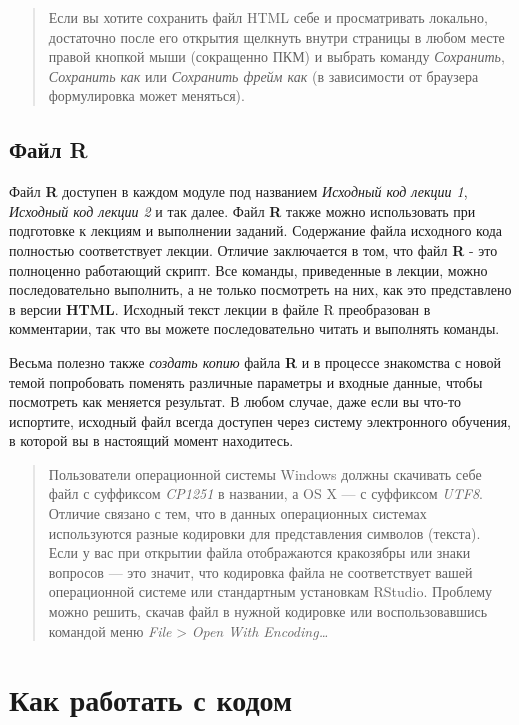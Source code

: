 \documentclass[]{book}
\begin{document}
\begin{quote}
Если вы хотите сохранить файл HTML себе и просматривать локально,
достаточно после его открытия щелкнуть внутри страницы в любом месте
правой кнопкой мыши (сокращенно ПКМ) и выбрать команду \emph{Сохранить},
\emph{Сохранить как} или \emph{Сохранить фрейм как} (в зависимости от
браузера формулировка может меняться).
\end{quote}

\subsection*{Файл R}\label{-r}

Файл \textbf{R} доступен в каждом модуле под названием \emph{Исходный
код лекции 1}, \emph{Исходный код лекции 2} и так далее. Файл \textbf{R}
также можно использовать при подготовке к лекциям и выполнении заданий.
Содержание файла исходного кода полностью соответствует лекции. Отличие
заключается в том, что файл \textbf{R} - это полноценно работающий
скрипт. Все команды, приведенные в лекции, можно последовательно
выполнить, а не только посмотреть на них, как это представлено в версии
\textbf{HTML}. Исходный текст лекции в файле R преобразован в
комментарии, так что вы можете последовательно читать и выполнять
команды.

Весьма полезно также \emph{создать копию} файла \textbf{R} и в процессе
знакомства с новой темой попробовать поменять различные параметры и
входные данные, чтобы посмотреть как меняется результат. В любом случае,
даже если вы что-то испортите, исходный файл всегда доступен через
систему электронного обучения, в которой вы в настоящий момент
находитесь.

\begin{quote}
Пользователи операционной системы Windows должны скачивать себе файл с
суффиксом \emph{CP1251} в названии, а OS X --- с суффиксом \emph{UTF8}.
Отличие связано с тем, что в данных операционных системах используются
разные кодировки для представления символов (текста). Если у вас при
открытии файла отображаются кракозябры или знаки вопросов --- это
значит, что кодировка файла не соответствует вашей операционной системе
или стандартным установкам RStudio. Проблему можно решить, скачав файл в
нужной кодировке или воспользовавшись командой меню \emph{File}
\textgreater{} \emph{Open With Encoding\ldots{}}
\end{quote}

\section*{Как работать с кодом}\label{---}
\end{document}
